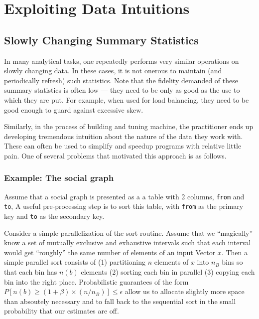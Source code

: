 \section{Exploiting Data Intuitions}
\subsection{Slowly Changing Summary Statistics}

In many analytical tasks, one repeatedly performs very similar operations on slowly
changing data. In these cases, 
it is not onerous to maintain (and periodically refresh) such statistics. 
Note that the fidelity demanded of these summary statistics is often low ---
they need to be only as good as the use to which they are put. For example, when
used for load balancing, they need to be good enough to guard against excessive
skew.

Similarly, 
in the process of building and tuning machine, the practitioner ends up
developing tremendous intuition about the nature of the data they work with.
These can often be used to simplify and speedup programs with relative little
pain. One of several problems that motivated this approach is as follows.



\subsubsection{Example: The social graph}

Assume that a social graph is presented as a 
a table with 2 columns, {\tt from} and {\tt to},
A useful pre-processing step is to sort this table, with {\tt from} as the
primary key and {\tt to} as the secondary key.

Consider a simple parallelization of the sort routine. Assume that we 
``magically'' know a set of mutually exclusive and exhaustive intervals such
that each interval would get ``roughly'' the same number of elements of an input
Vector \(x\). Then a simple parallel sort consists of 
(1) partitioning \(n\) elements of \(x\) into \(n_B\) bins so that each bin has
\(n(b)\) elements
(2) sorting each bin in parallel
(3) copying each bin into the right place. Probabilistic guarantees
of the form \(P[n(b) \geq (1+\beta) \times(n/n_B)] \leq \epsilon\) 
allow us to allocate slightly more space than absoutely necessary and to 
fall back to the sequential sort in the small probability that our estimates are off.

